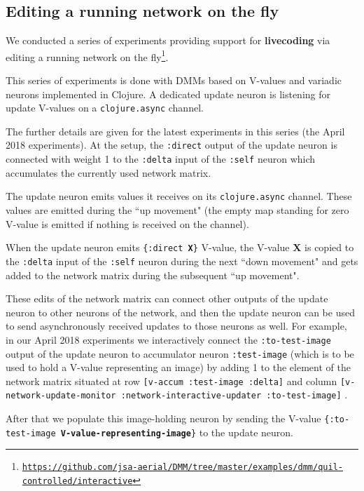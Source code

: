 \documentclass{article}
\begin{document}
\subsection{Editing a running network on the fly}\label{sec:editing}

We conducted a series of experiments providing support for {\bf livecoding} via editing
a running network on the fly\footnote{\href{https://github.com/jsa-aerial/DMM/tree/master/examples/dmm/quil-controlled/interactive}
{\scriptsize\tt https://github.com/jsa-aerial/DMM/tree/master/examples/dmm/quil-controlled/interactive}}. 

This series of experiments is done with DMMs based on V-values and variadic neurons implemented in Clojure. A dedicated update neuron
is listening for update V-values on a {\tt clojure.async} channel. 

The further details are given for the latest experiments in this series
(the April 2018 experiments). At the setup, the {\tt :direct} output of the update neuron is
connected with weight 1 to the {\tt :delta} input of the {\tt :self} neuron which accumulates the currently used network matrix.

The update neuron emits values it receives on its {\tt clojure.async} channel. These values are emitted during the ``up movement" (the empty
map standing for zero V-value is emitted if nothing is received on the channel).

When the update neuron emits {\tt \{:direct {\bf X}\}} V-value, the V-value {\bf X} is copied to the {\tt :delta} input of the {\tt :self} neuron
during the next ``down movement" and gets added to the network matrix during the subsequent ``up movement".

These edits of the network matrix can connect other outputs of the update neuron to other neurons of the network, and then
the update neuron can be used to send asynchronously received updates to those neurons as well. For example, in our April 2018 experiments
we interactively connect the {\tt :to-test-image} output of the update neuron to accumulator neuron {\tt :test-image} (which is to be used to
hold a V-value representing an image) by adding 1 to the element of the network matrix situated at row {\tt [v-accum :test-image :delta]}
and column {\small\tt [v-network-update-monitor :network-interactive-updater :to-test-image]} . 

After that we populate this image-holding neuron by sending the V-value
 {\tt \{:to-test-image {\bf V-value-representing-image}\}} to the update neuron.
\end{document}
